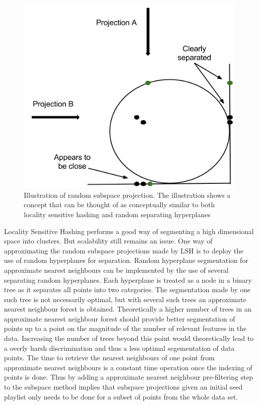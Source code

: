 \documentclass[a4paper,11pt]{kth-mag}
\begin{document}
\begin{figure}
\includegraphics[scale=0.5]{images/LSH.png}
\caption{Illustration of random subspace projection. The illustration shows a concept that can be thought of as conceptually similar to both locality sensitive hashing and random separating hyperplanes}
\end{figure}

Locality Sensitive Hashing performs a good way of segmenting a high dimensional space into clusters. But scalability still remains an issue. One way of approximating the random subspace projections made by LSH is to deploy the use of random hyperplanes for separation. Random hyperplane segmentation for approximate nearest neighbours can be implemented by the use of several separating random hyperplanes. Each hyperplane is treated as a node in a binary tree as it separates all points into two categories. The segmentation made by one such tree is not necessarily optimal, but with several such trees an approximate nearest neighbour forest is obtained. Theoretically a higher number of trees in an approximate nearest neighbour forest should provide better segmentation of points up to a point on the magnitude of the number of relevant features in the data. Increasing the number of trees beyond this point would theoretically lead to a overly harsh discrimination and thus a less optimal segementation of data points. The time to retrieve the nearest neighbours of one point from approximate nearest neighbours is a constant time operation once the indexing of points is done. Thus by adding a approximate nearest neighbour pre-filtering step to the subspace method implies that subspace projections given an initial seed playlist only needs to be done for a subset of points from the whole data set.
\end{document}
